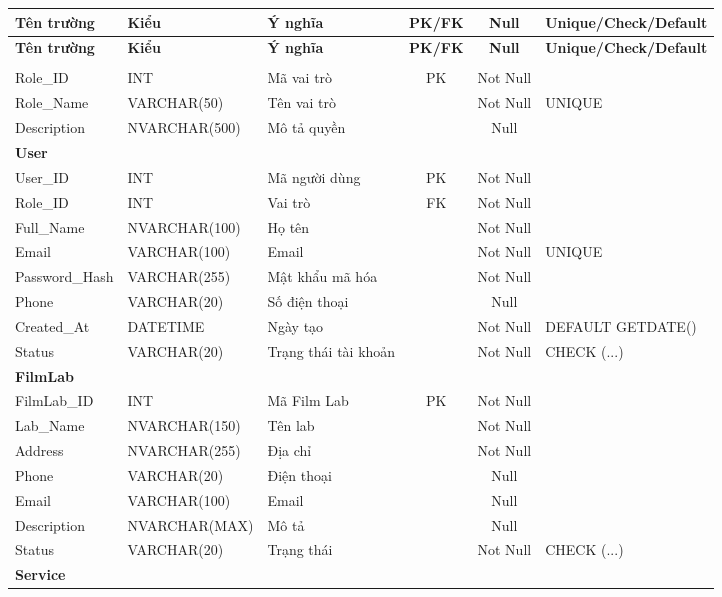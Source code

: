 \documentclass[12pt,a4paper]{article}
\begin{document}
\begin{longtable}{|l|l|p{4.2cm}|c|c|p{3.5cm}|}
\hline
\textbf{Tên trường} & \textbf{Kiểu} & \textbf{Ý nghĩa} & \textbf{PK/FK} & \textbf{Null} & \textbf{Unique/Check/Default} \\
\hline
\endfirsthead
\hline
\textbf{Tên trường} & \textbf{Kiểu} & \textbf{Ý nghĩa} & \textbf{PK/FK} & \textbf{Null} & \textbf{Unique/Check/Default} \\
\hline
\endhead
\hline
\endfoot

\multicolumn{6}{|l|}{\textbf{Role}} \\
\hline
Role\_ID & INT & Mã vai trò & PK & Not Null & \\
Role\_Name & VARCHAR(50) & Tên vai trò & & Not Null & UNIQUE \\
Description & NVARCHAR(500) & Mô tả quyền & & Null & \\
\hline
\multicolumn{6}{|l|}{\textbf{User}} \\
\hline
User\_ID & INT & Mã người dùng & PK & Not Null & \\
Role\_ID & INT & Vai trò & FK & Not Null & \\
Full\_Name & NVARCHAR(100) & Họ tên & & Not Null & \\
Email & VARCHAR(100) & Email & & Not Null & UNIQUE \\
Password\_Hash & VARCHAR(255) & Mật khẩu mã hóa & & Not Null & \\
Phone & VARCHAR(20) & Số điện thoại & & Null & \\
Created\_At & DATETIME & Ngày tạo & & Not Null & DEFAULT GETDATE() \\
Status & VARCHAR(20) & Trạng thái tài khoản & & Not Null & CHECK (...) \\
\hline
\multicolumn{6}{|l|}{\textbf{FilmLab}} \\
\hline
FilmLab\_ID & INT & Mã Film Lab & PK & Not Null & \\
Lab\_Name & NVARCHAR(150) & Tên lab & & Not Null & \\
Address & NVARCHAR(255) & Địa chỉ & & Not Null & \\
Phone & VARCHAR(20) & Điện thoại & & Null & \\
Email & VARCHAR(100) & Email & & Null & \\
Description & NVARCHAR(MAX) & Mô tả & & Null & \\
Status & VARCHAR(20) & Trạng thái & & Not Null & CHECK (...) \\
\hline
\multicolumn{6}{|l|}{\textbf{Service}} \\

\end{longtable}
\end{document}
